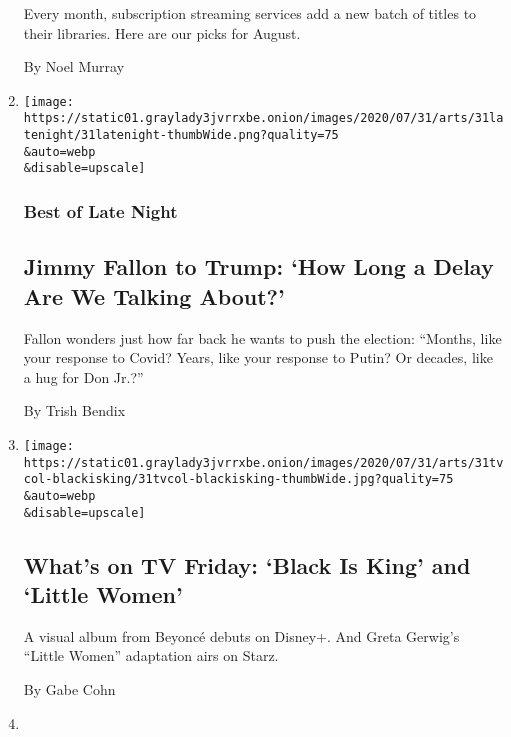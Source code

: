 \begin{enumerate}
  Every month, subscription streaming services add a new batch of titles
  to their libraries. Here are our picks for August.

  By Noel Murray
\item
  \href{/2020/07/31/arts/television/late-night-trump-delay-election.html}{}

  \texttt{[image: https://static01.graylady3jvrrxbe.onion/images/2020/07/31/arts/31latenight/31latenight-thumbWide.png?quality=75\\\&auto=webp\\\&disable=upscale]}

  \hypertarget{best-of-late-night-1}{%
  \subsubsection{Best of Late Night}\label{best-of-late-night-1}}

  \hypertarget{jimmy-fallon-to-trump-how-long-a-delay-are-we-talking-about}{%
  \subsection{Jimmy Fallon to Trump: `How Long a Delay Are We Talking
  About?'}\label{jimmy-fallon-to-trump-how-long-a-delay-are-we-talking-about}}

  Fallon wonders just how far back he wants to push the election:
  ``Months, like your response to Covid? Years, like your response to
  Putin? Or decades, like a hug for Don Jr.?''

  By Trish Bendix
\item
  \href{/2020/07/31/arts/television/whats-on-tv-friday-black-is-king-and-little-women.html}{}

  \texttt{[image: https://static01.graylady3jvrrxbe.onion/images/2020/07/31/arts/31tvcol-blackisking/31tvcol-blackisking-thumbWide.jpg?quality=75\\\&auto=webp\\\&disable=upscale]}

  \hypertarget{whats-on-tv-friday-black-is-king-and-little-women}{%
  \subsection{What's on TV Friday: `Black Is King' and `Little
  Women'}\label{whats-on-tv-friday-black-is-king-and-little-women}}

  A visual album from Beyoncé debuts on Disney+. And Greta Gerwig's
  ``Little Women'' adaptation airs on Starz.

  By Gabe Cohn
\item
  \href{/2020/07/31/arts/television/bryan-cranston-coronavirus-plasma.html}{}


\end{enumerate}
